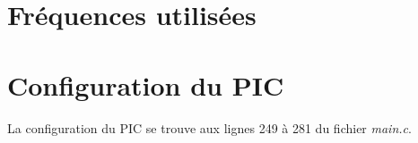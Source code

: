 \documentclass{article}
\begin{document}
    \newpage
    \section{Fréquences utilisées}



    \newpage
    \section{Configuration du PIC}
    \label{section:configuration}

    \paragraph{}
    La configuration du PIC se trouve aux lignes 249 à 281 du fichier \emph{main.c}.

\end{document}
